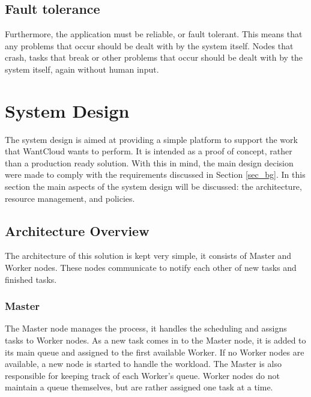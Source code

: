\documentclass{acm_proc_article-sp}
\begin{document}
\subsection{Fault tolerance}
Furthermore, the application must be reliable, or fault tolerant.
This means that any problems that occur should be dealt with by the system itself.
Nodes that crash, tasks that break or other problems that occur should be dealt with by the system itself, again without human input.

\section{System Design}
\label{sec_system}
The system design is aimed at providing a simple platform to support the work that WantCloud wants to perform.
It is intended as a proof of concept, rather than a production ready solution.
With this in mind, the main design decision were made to comply with the requirements discussed in Section \ref{sec_bg}.
In this section the main aspects of the system design will be discussed: the architecture, resource management, and policies.

\subsection{Architecture Overview}
The architecture of this solution is kept very simple, it consists of Master and Worker nodes.
These nodes communicate to notify each other of new tasks and finished tasks.

\subsubsection{Master}
The Master node manages the process, it handles the scheduling and assigns tasks to Worker nodes.
As a new task comes in to the Master node, it is added to its main queue and assigned to the first available Worker.
If no Worker nodes are available, a new node is started to handle the workload.
The Master is also responsible for keeping track of each Worker's queue.
Worker nodes do not maintain a queue themselves, but are rather assigned one task at a time.
\end{document}
